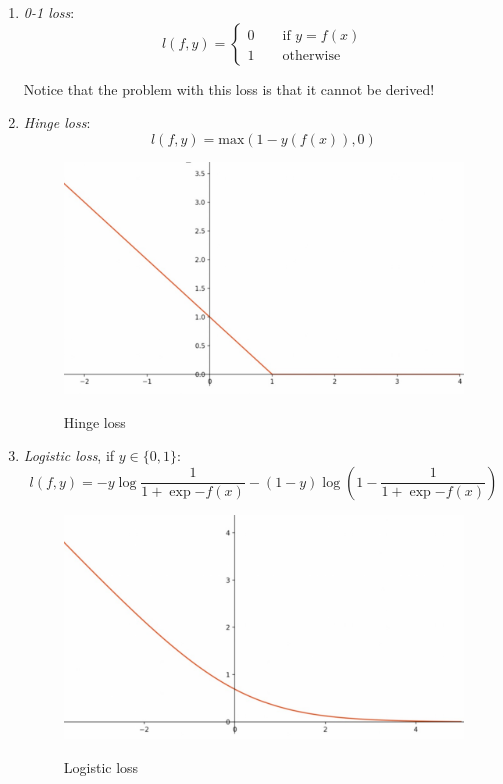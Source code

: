 \begin{enumerate}
    \item \textit{0-1 loss}:
    $$
    l(f,y) = \begin{cases}
	0 \qquad \text{if } y = f(x)\\
	1 \qquad \text{otherwise} 
	\end{cases}
    $$

    Notice that the problem with this loss is that it cannot be derived!
    
    \item \textit{Hinge loss}:
    $$
    l(f,y) = \text{max} (1 - y(f(x)), 0)
    $$
    \begin{figure}[h!]
		\centering
		\includegraphics[scale = 0.5]{img/hinge loss.jpg}
        \label{hinge loss}
        \caption{Hinge loss}
    \end{figure}

    \item \textit{Logistic loss}, if $y \in \{ 0,1 \}$:
    $$
    l(f,y) = -y \log \frac{1}{1 + \exp{-f(x)}} - (1-y) \log (1 - \frac{1}{1 + \exp{-f(x)}})
    $$

    \begin{figure}[h!]
		\centering
		\includegraphics[scale = 0.5]{img/logistic loss.jpg}
        \label{logistic loss}
        \caption{Logistic loss}
    \end{figure}
    
\end{enumerate}

